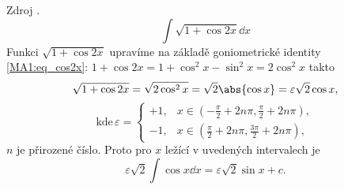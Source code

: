 \begin{mdframed}[style=mdexam]
  \begin{example}\label{MAI:exam131}
    Zdroj \cite[s.~30]{Knichal}.
    \begin{equation}\label{MA:int_ex_04}
      \int{\sqrt{1+\cos2x}\dd{x}}
    \end{equation}
    Funkci $\sqrt{1+\cos2x}$ upravíme na základě goniometrické identity \ref{MA1:eq_cos2x}:
    \(1+\cos2x = 1+\cos^2x-\sin^2x=2\cos^2x\) takto
    \begin{equation*}
      \sqrt{1+\cos2x} =\sqrt{2\cos^2x} = \sqrt{2}\abs{\cos x} = \varepsilon\sqrt{2}\cos x, 
    \end{equation*}
    \begin{equation*}
      \text{kde}\,\varepsilon =
        \begin{cases} 
         +1, &  x\in \left(-\frac{\pi}{2}+2n\pi,\frac{\pi}{2}+2n\pi\right), \\
         -1, &  x\in \left(\frac{\pi}{2}+2n\pi,\frac{3\pi}{2}+2n\pi\right),
        \end{cases}
    \end{equation*}
    $n$ je přirozené číslo. Proto pro $x$ ležící v uvedených intervalech je
    \begin{equation*}
      \varepsilon\sqrt{2}\int\cos x\dd{x} = \varepsilon\sqrt{2}\sin x + c.
    \end{equation*}
  \end{example}
\end{mdframed}